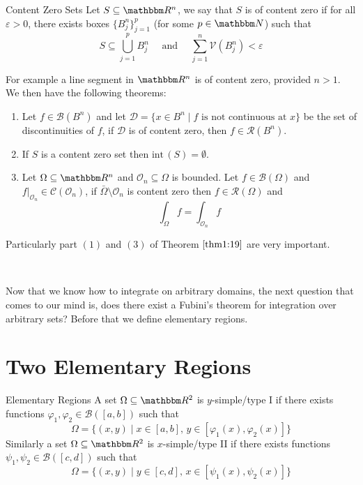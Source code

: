 \documentclass[../Analysis-3.tex]{subfiles}
\begin{document}
\begin{Def}{Content Zero Sets}{}
  Let $S \subseteq \R^n$, we say that $S$ is of content zero if for all $\varepsilon > 0$, there exists boxes $\{ B_j^n \}_{j=1}^p$ (for some $p \in \N$) such that
  \[
    S \subseteq \bigcup_{j=1}^p B_j^n \quad \mbox{ and } \quad \sum_{j=1}^n \mathcal{V}(B^n_j) < \varepsilon
  \]
\end{Def}

For example a line segment in $\R^n$ is of content zero, provided $n > 1$. We then have the following theorems:

\begin{Thm}{}{}\label{thm1:19}
  \begin{enumerate}
    \item Let $f \in \mathscr{B}(B^n)$ and let $\mathcal{D} = \{ x \in B^n \mid f \mbox{ is not continuous at } x \}$ be the set of discontinuities of $f$, if $\mathcal{D}$ is of content zero, then $f \in \mathscr{R}(B^n)$.

    \item If $S$ is a content zero set then $\mathrm{int}\,(S) = \emptyset$.

    \item Let $\Omega \subseteq \R^n$ and $\mathcal{O}_n \subseteq \Omega$ is bounded. Let $f \in \mathscr{B}(\Omega)$ and $f\vert_{\mathcal{O}_n} \in \mathscr{C}(\mathcal{O}_n)$, if $\bar{\Omega}\setminus \mathcal{O}_n$ is content zero then $f \in \mathscr{R}(\Omega)$ and
          \[
            \int_{\Omega} f = \int_{\mathcal{O}_n} f
          \]
  \end{enumerate}
\end{Thm}
Particularly part $(1)$ and $(3)$ of Theorem $\ref{thm1:19}$ are very important.

\

Now that we know how to integrate on arbitrary domains, the next question that comes to our mind is, does there exist a Fubini's theorem for integration over arbitrary sets? Before that we define elementary regions.

\section{Two Elementary Regions}

\begin{Def}{Elementary Regions}{}
  A set $\Omega \subseteq \R^2$ is $y$-simple/type I if there exists functions $\varphi_1, \varphi_2 \in \mathscr{B}([a,b])$ such that
  \[
    \Omega = \{ (x,y) \mid x \in [a,b], \, y \in [\varphi_1(x), \varphi_2(x)] \}
  \]
  Similarly a set $\Omega \subseteq \R^2$ is $x$-simple/type II if there exists functions $\psi_1, \psi_2 \in \mathscr{B}([c,d])$ such that
  \[
    \Omega = \{ (x,y) \mid y \in [c,d], \, x \in [ \psi_1(x), \psi_2(x) ] \}
  \]
\end{Def}
\end{document}
